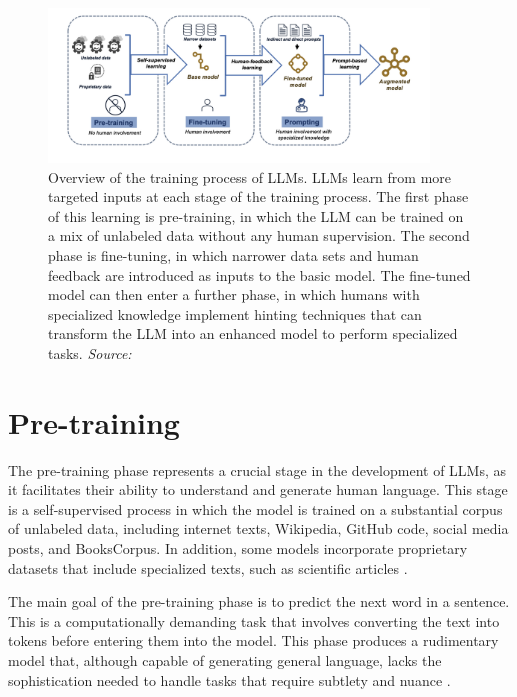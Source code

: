 \begin{figure}[h!]
    \centering
    \includegraphics[width=0.9\textwidth]{images/llms/LLM-training-process.png}
    \caption{Overview of the training process of LLMs. LLMs learn from more targeted inputs at each stage of the training process. The first phase of this learning is pre-training, in which the LLM can be trained on a mix of unlabeled data without any human supervision. The second phase is fine-tuning, in which narrower data sets and human feedback are introduced as inputs to the basic model. The fine-tuned model can then enter a further phase, in which humans with specialized knowledge implement hinting techniques that can transform the LLM into an enhanced model to perform specialized tasks. \textit{Source:} \cite{omiye2023large}}
    \label{fig:training-process}
\end{figure}

\section{Pre-training}

The pre-training phase represents a crucial stage in the development of LLMs, as it facilitates their ability to understand and generate human language. This stage is a self-supervised process in which the model is trained on a substantial corpus of unlabeled data, including internet texts, Wikipedia, GitHub code, social media posts, and BooksCorpus. In addition, some models incorporate proprietary datasets that include specialized texts, such as scientific articles \cite{brown2020language, devlin2018bert}.

The main goal of the pre-training phase is to predict the next word in a sentence. This is a computationally demanding task that involves converting the text into tokens before entering them into the model. This phase produces a rudimentary model that, although capable of generating general language, lacks the sophistication needed to handle tasks that require subtlety and nuance \cite{radford2019language}.

